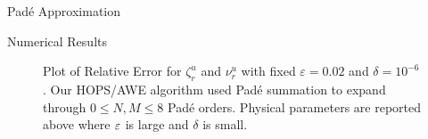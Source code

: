 \begin{section}{Pad\'e Approximation}
\begin{section}{Numerical Results}
\vspace{-20mm}
\begin{figure}[H]
\centering
\vspace{2mm}
\caption{Plot of Relative Error for $\zeta^u_r$ and $\nu^u_r$ with fixed $\varepsilon = 0.02$ and $\delta = 10^{-6}$. Our HOPS/AWE algorithm used Padé summation to expand through $0 \leq N,M \leq 8$ Padé orders. Physical parameters are reported above where $\varepsilon$ is large and $\delta$ is small.}
\end{figure}


\end{section}
\end{section}
